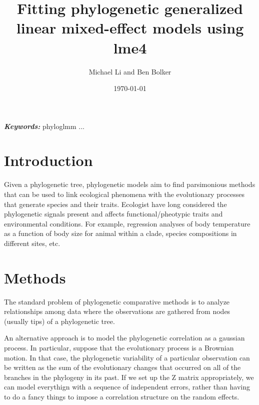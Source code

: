 \documentclass[12pt]{article}
\title{Fitting phylogenetic generalized linear mixed-effect models using lme4 }
\author{Michael Li and Ben Bolker}
\date{\today}
\providecommand{\keywords}[1]{\textbf{\textit{Keywords:}} #1}
\begin{document}
\newcommand{\dbic}{\ensuremath \Delta \textrm{BIC}}

\newcommand{\bmbhide}[1]{}
\newcommand{\bmb}[1]{{\color{blue} BB: #1}}

\newcommand{\fref}[1]{Figure~\ref{fig:#1}}

\newcommand{\ml}[1]{{\color{red} ML: #1}}

\newcommand{\add}[1]{{\color{blue} ADD: #1}}

\maketitle

\doublespacing

\keywords{phyloglmm ... }

\section{Introduction}

Given a phylogenetic tree, phylogenetic models aim to find parsimonious methods that can be used to link ecological phenomena with the evolutionary processes that generate species and their traits. 
Ecologist have long considered the phylogenetic signals present and affects  functional/pheotypic traits and environmental conditions. 
For example, regression analyses of body temperature as a function of body size for animal within a clade, species compositions in different sites, etc. 


\section{Methods}


The standard problem of phylogenetic comparative methods is to analyze relationships among data where the observations are gathered from nodes (usually tips) of a phylogenetic tree. 

An alternative approach is to model the phylogenetic correlation as a gaussian process. 
In particular, suppose that the evolutionary process is a Brownian motion. 
In that case, the phylogenetic variability of a particular observation can be written as the sum of the evolutionary changes that occurred on all of the branches in the phylogeny in its past. 
If we set up the Z matrix appropriately, we can model everythign with a sequence of independent errors, rather than having to do a fancy things to impose a correlation structure on the random effects. 
\end{document}
